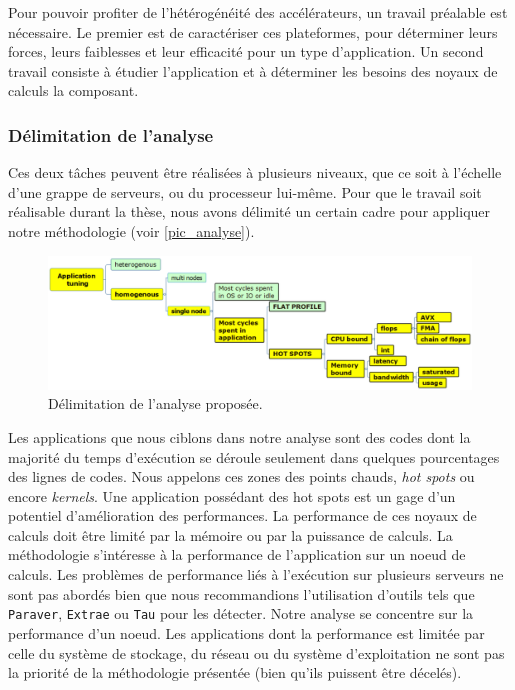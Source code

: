    Pour pouvoir profiter de l'hétérogénéité des accélérateurs, un travail préalable est nécessaire. Le premier est de caractériser ces plateformes, pour déterminer leurs forces, leurs faiblesses et leur efficacité pour un type d'application. Un second travail consiste à étudier l'application et à déterminer les besoins des noyaux de calculs la composant.
    
    
    \subsubsection{Délimitation de l'analyse}

        Ces deux tâches peuvent être réalisées à plusieurs niveaux, que ce soit à l'échelle d'une grappe de serveurs, ou du processeur lui-même. Pour que le travail soit réalisable durant la thèse, nous avons délimité un certain cadre pour appliquer notre méthodologie (voir \autoref{pic_analyse}).
        
         \begin{figure}[h!]
            \center
            \includegraphics[width=14cm]{images/analyse.png}
            \caption{\label{pic_analyse} Délimitation de l'analyse proposée.}
        \end{figure}
        
        Les applications que nous ciblons dans notre analyse sont des codes dont la majorité du temps d'exécution se déroule seulement dans quelques pourcentages des lignes de codes. Nous appelons ces zones des points chauds, \textit{hot spots} ou encore \textit{kernels}. Une application possédant des hot spots est un gage d'un potentiel d'amélioration des performances. La performance de ces noyaux de calculs doit être limité par la mémoire ou par la puissance de calculs.
        La méthodologie s'intéresse à la performance de l'application sur un noeud de calculs. Les problèmes de performance liés à l'exécution sur plusieurs serveurs ne sont pas abordés bien que nous recommandions l'utilisation d'outils tels que \verb=Paraver=, \verb=Extrae= ou \verb=Tau= pour les détecter. Notre analyse se concentre sur la performance d'un noeud. Les applications dont la performance est limitée par  celle du système de stockage, du réseau ou du système d'exploitation ne sont pas la priorité de la méthodologie présentée (bien qu'ils puissent être décelés).
        
